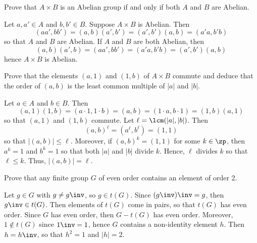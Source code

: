 \begin{exercise} \label{ex1.1.29}
    Prove that $A \times B$ is an Abelian group if and only if both $A$ and $B$ are Abelian.
\end{exercise}

\begin{sol}
    Let $a, a' \in A$ and $b, b' \in B$. Suppose $A \times B$ is Abelian. Then
    \[(aa', bb') = (a, b)(a', b') = (a', b')(a, b) = (a'a, b'b)\]
    so that $A$ and $B$ are Abelian. If $A$ and $B$ are both Abelian, then
    \[(a, b)(a', b) = (aa', bb') = (a'a, b'b) = (a', b')(a, b)\]
    hence $A \times B$ is Abelian.
\end{sol}

\begin{exercise}\label{ex1.1.30}
    Prove that the elements $(a, 1)$ and $(1, b)$ of $A \times B$ commute and deduce that the order of $(a, b)$ is the least common multiple of $|a|$ and $|b|$.
\end{exercise}

\begin{sol}
    Let $a \in A$ and $b \in B$. Then
    \[(a, 1)(1, b) = (a \cdot 1, 1 \cdot b) = (a, b) = (1 \cdot a, b \cdot 1) = (1, b)(a, 1)\]
    so that $(a, 1)$ and $(1, b)$ commute. Let $\ell = \lcm(|a|, |b|)$. Then
    \[(a, b)^{\ell} = (a^{\ell}, b^{\ell}) = (1, 1)\]
    so that $|(a, b)| \leq \ell$. Moreover, if $(a, b)^k = (1, 1)$ for some $k \in \zp$, then $a^k = 1$ and $b^k = 1$ so that both $|a|$ and $|b|$ divide $k$. Hence, $\ell$ divides $k$ so that $\ell \leq k$. Thus, $|(a, b)| = \ell$.
\end{sol}

\begin{exercise} \label{ex1.1.31}
    Prove that any finite group $G$ of even order contains an element of order 2. 
    
\end{exercise}

\begin{sol}
    Let $g \in G$ with $g \neq g\inv$, so $g \in t(G)$. Since $(g\inv)\inv = g$, then $g\inv \in t(G)$. Then elements of $t(G)$ come in pairs, so that $t(G)$ has even order. Since $G$ has even order, then $G - t(G)$ has even order. Moreover, $1 \not\in t(G)$ since $1\inv = 1$, hence $G$ contains a non-identity element $h$. Then $h = h\inv$, so that $h^2 = 1$ and $|h| = 2$.
\end{sol}

